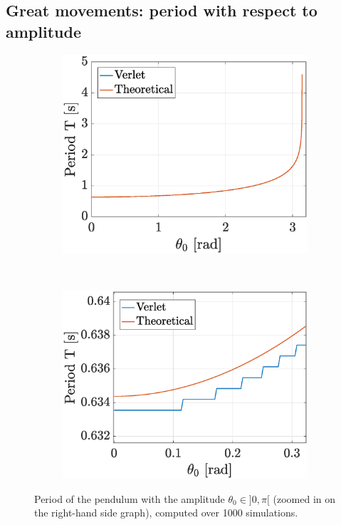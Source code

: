 \documentclass[a4paper,12pt,twoside]{article}
\begin{document}
\subsection{Great movements: period with respect to amplitude}

\begin{figure}[h]
\begin{subfigure}[t]{0.49\textwidth}
	\includegraphics[width=\textwidth]{graphs/b_period.eps}
\end{subfigure}
~
\begin{subfigure}[t]{0.49\textwidth}
	\includegraphics[width=\textwidth]{graphs/b_period_zoom.eps}
\end{subfigure}
\caption{Period of the pendulum with the amplitude $\theta_0 \in ]0,\pi[$ (zoomed in on the right-hand side graph), computed over \num{1000} simulations.}
\label{fig:b-period}
\end{figure}
\end{document}
